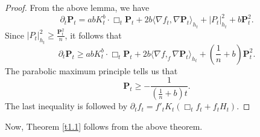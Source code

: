 \documentclass{amsart}
\theoremstyle{definition}
\theoremstyle{remark}
\numberwithin{equation}{section}
\begin{document}
\begin{proof} From the above lemma, we have
\begin{equation*}
\partial_{t}\mathbf{P}_{t}=abK^{b}_{t}\cdot\Box_{t} \mathbf{P}_{t}
+2b\langle\nabla f_{t},\nabla \mathbf{P}_{t}\rangle_{h_{t}}
+|P_{t}|^{2}_{h_{t}}+b\mathbf{P}^{2}_{t}.
\end{equation*}
Since $|P_{t}|^{2}_{h_{t}}\geq\frac{\mathbf{P}^{2}_{t}}{n}$, it follows that
\begin{equation*}
\partial_{t}\mathbf{P}_{t}\geq abK^{b}_{t}\cdot\Box_{t}\mathbf{P}_{t}
+2b\langle\nabla f,_{f}\nabla \mathbf{P}_{t}\rangle_{h_{t}}+\left(\frac{1}{n}+b\right)\mathbf{P}^{2}_{t}.
\end{equation*}
The parabolic maximum principle tells us that
\begin{equation*}
\mathbf{P}_{t}\geq-\frac{1}{\left(\frac{1}{n}+b\right)t}.
\end{equation*}
The last inequality is followed by $\partial_{t}f_{t}=f'_{t}K_{t}(\Box_{t} f_{t}
+f_{t}H_{t})$.
\end{proof}

Now, Theorem \ref{t1.1} follows from the above theorem.
\end{document}
